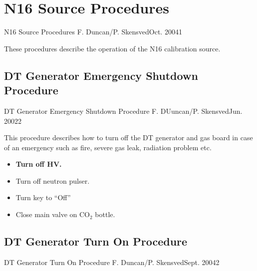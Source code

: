 

  
\section{N16 Source Procedures}

             {N16 Source Procedures}
             {F. Duncan/P. Skensved}{Oct. 2004}{1}



  These procedures describe the operation of the N16 calibration
source.


\newpage

\subsection{DT Generator Emergency Shutdown Procedure}


             {DT Generator Emergency Shutdown Procedure}
             {F. DUuncan/P. Skensved}{Jun. 2002}{2}



  This procedure describes how to turn off the DT generator and
gas board in case of an emergency such as fire, severe gas leak,
radiation problem etc.



\begin{itemize}
\item {\bf Turn off HV. }
\item Turn off neutron pulser.
\item Turn key to  ``Off''
\item Close main valve on CO$_2$ bottle.


\end{itemize}




\newpage
\subsection{DT Generator Turn On Procedure}


             {DT Generator Turn On Procedure}
             {F. Duncan/P. Skensved}{Sept. 2004}{2}



